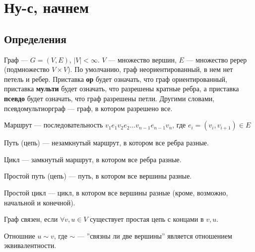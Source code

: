 
\section{Ну-с, начнем}
\subsection{Определения}
\begin{definition}
    Граф --- \(G = (V, E)\), \(|V| < \infty\). \(V\) --- множество вершин, \(E\) --- множество ререр (подмножество \(V\times V\)). По умолчанию, граф неориентированный, в нем нет петель и ребер. Приставка \textbf{ор} будет означать, что граф ориентированный, приставка \textbf{мульти} будет означать, что разрешены кратные ребра, а приставка \textbf{псевдо} будет означать, что граф разрешены петли. Другими словами, псевдомультиорграф --- граф, в котором разрешено все.
\end{definition}

\begin{definition}
    Маршрут --- последовательность \(v_1e_1v_2e_2\dots v_{n-1}e_{n-1}v_n\), где \(e_i = (v_i, v_{i + 1}) \in E\)
\end{definition}

\begin{definition}
    Путь (цепь) --- незамкнутый маршрут, в котором все ребра разные.
\end{definition}

\begin{definition}
    Цикл --- замкнутый маршрут, в котором все ребра разные.
\end{definition}

\begin{definition}
    Простой путь (цепь) --- путь, в котором все вершины разные.
\end{definition}

\begin{definition}
    Простой цикл --- цикл, в котором все вершины разные (кроме, возможно, начальной и конечной).
\end{definition}

\begin{definition}
    Граф связен, если \(\forall v, u \in V\) существует простая цепь с концами в \(v, u\).
\end{definition}

\begin{note}
    Отношние \(u \sim v\), где \(\sim\) --- ''связны ли две вершины'' является отношением эквивалентности.
\end{note}

